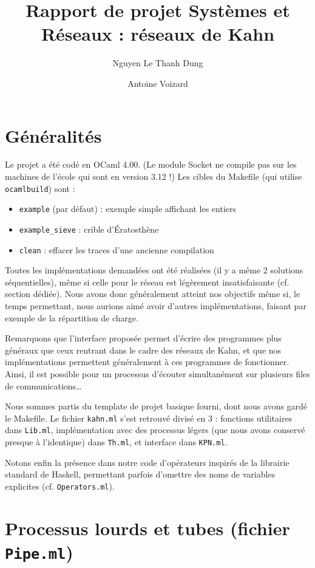 \documentclass[a4paper, 11pt]{article}
\title{Rapport de projet Systèmes et Réseaux : réseaux de Kahn}
\author{Nguyen Le Thanh Dung \and Antoine Voizard}
\begin{document}
\maketitle

\section*{Généralités}

Le projet a été codé en OCaml 4.00. (Le module Socket ne compile pas
sur les machines de l'école qui sont en version 3.12 !) Les cibles du
Makefile (qui utilise \texttt{ocamlbuild}) sont : 
\begin{itemize}
\item \texttt{example} (par défaut) : exemple simple affichant les
  entiers
\item \texttt{example\_sieve} : crible d'\'Eratosthène
\item \texttt{clean} : effacer les traces d'une ancienne compilation
\end{itemize}

Toutes les implémentations demandées ont été réalisées (il y a même 2
solutions séquentielles), même si celle pour le réseau est légèrement
insatisfaisante (cf. section dédiée). Nous avons donc généralement
atteint nos objectifs même si, le temps permettant, nous aurions aimé
avoir d'autres implémentations, faisant par exemple de la répartition
de charge.

Remarquons que l'interface proposée permet d'écrire des programmes plus
généraux que ceux rentrant dans le cadre des réseaux de Kahn, et que
nos implémentations permettent généralement à ces programmes de
fonctionner. Ainsi, il est possible pour un processus d'écouter
simultanément sur plusieurs files de communications\ldots

Nous sommes partis du template de projet basique fourni, dont nous
avons gardé le Makefile. Le fichier \texttt{kahn.ml} s'est retrouvé
divisé en 3 : fonctions utilitaires dans \texttt{Lib.ml},
implémentation avec des processus légers (que nous avons conservé presque à
l'identique) dans \texttt{Th.ml}, et interface dans \texttt{KPN.ml}.

Notons enfin la présence dans notre code d'opérateurs inspirés de
la librairie standard de Haskell, permettant parfois d'omettre des
noms de variables explicites (cf. \texttt{Operators.ml}).


\section*{Processus lourds et tubes (fichier \texttt{Pipe.ml})}
\end{document}
